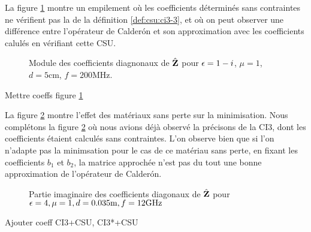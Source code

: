   La figure \ref{fig:imp_fourier:plan:stupfel:hoibc_vs_csu} montre un empilement où les coefficients déterminés sans contraintes ne vérifient pas la  de la définition \ref{def:csu:ci3-3}, et où on peut observer une différence entre l'opérateur de Calderón et son approximation avec les coefficients calulés en vérifiant cette CSU.

  \begin{figure}[!hbt]
    \centering
    
    \caption[Module de la matrice d'impédance pour le matériau M1, perte de précision à cause de la CSU]{ Module des coefficients diagnonaux de \(\hat{\mathbf{Z}}\) pour \(\epsilon = 1-i\), \(\mu = 1\), \(d=5\)cm, \(f=200\)MHz.}
    \label{fig:imp_fourier:plan:stupfel:hoibc_vs_csu}
  \end{figure}

  \begin{TODO}
    Mettre coeffs figure \ref{fig:imp_fourier:plan:stupfel:hoibc_vs_csu}
  \end{TODO}

  \FloatBarrier

  La figure \ref{fig:imp_fourier:plan:soudais:hoibc_csu} montre l'effet des matériaux sans perte sur la minimisation.
  Nous complétons la figure \ref{fig:imp_fourier:plan:soudais:hoibc_csu} où nous avions déjà observé la précisons de la CI3, dont les coefficients étaient calculés sans contraintes.
  L'on observe bien que si l'on n'adapte pas la minimsation pour le cas de ce matériau sans perte, en fixant les coefficients \(b_1\) et \(b_2\), la matrice approchée n'est pas du tout une bonne approximation de l'opérateur de Calderón.

  \begin{figure}[!hbt]
    \centering
    
    \caption[Partie imaginaire de l'opérateur de Calderón, comparé avec les approximations CI0, CI3, CI3 avec CSU, CI3 avec CSU adaptée pour une couche plane de matériau sans pertes de P.~Soudais]{Partie imaginaire des coefficients diagonaux de \(\hat{\mathbf{Z}}\) pour \(\epsilon = 4, \mu = 1, d=0.035\text{m}, f=12\text{GHz}\)}
    \label{fig:imp_fourier:plan:soudais:hoibc_csu}
  \end{figure}

  \begin{table}[!hbt]
    \centering
    \begin{TODO}
      Ajouter coeff CI3+CSU, CI3*+CSU
    \end{TODO}
    \caption{Coefficients associés à la figure \ref{fig:imp_fourier:plan:soudais:hoibc_csu}}
    \label{tab:imp_fourier:plan:soudais:hoibc_csu}
  \end{table}

  \FloatBarrier